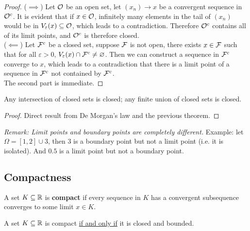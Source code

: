 \documentclass[11pt]{article}
\begin{document}
	\begin{proof}
		($\implies$) Let $\mathcal{{O}}$ be an open set, let $(x_n) \to x$ be a convergent sequence in $\mathcal{{O}}^c$. It is evident that if $x \in \mathcal{{O}}$, infinitely many elements in the tail of $(x_n)$ would be in $V_\varepsilon(x) \subseteq \mathcal{{O}}$, which leads to a contradiction. Therefore $\mathcal{{O}}^c$ contains all of its limit points, and $\mathcal{{O}}^c$ is therefore closed.
		\\($\impliedby$) Let $\mathcal{{F}}^c$ be a closed set, suppose $\mathcal{{F}}$ is not open, there exists $x \in \mathcal{{F}}$ such that for all $\varepsilon > 0$, $V_\varepsilon(x) \cap \mathcal{{F}}^c \neq \varnothing$. Then we can construct a sequence in $\mathcal{{F}}^c$ converge to $x$, which leads to a contradiction that there is a limit point of a sequence in $\mathcal{{F}}^c$ not contained by $\mathcal{{F}}^c$. \\
		The second part is immediate.
	\end{proof}
	
	\begin{theorem}
		Any intersection of closed sets is closed; any finite union of closed  sets is closed.
	\end{theorem}
	
	\begin{proof}
		Direct result from De Morgan's law and the previous theorem.
	\end{proof}
	
	\emph{Remark: Limit points and boundary points are completely different.} Example: let $\Omega = [1, 2] \cup {3}$, then $3$ is a boundary point but not a limit point (i.e. it is isolated). And $0.5$ is a limit point but not a boundary point.
	
	\subsection{Compactness}
	\begin{definition}
		A set $K \subseteq \mathbb{R}$ is \textbf{compact} if every sequence in $K$ has a convergent subsequence converges to some limit $x \in K$.
	\end{definition}
	
	\begin{theorem}
		A set $K \subseteq \mathbb{R}$ is compact \ul{if and only if} it is closed and bounded.
	\end{theorem}
	
\end{document}
